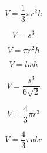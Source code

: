 






\[\begin{equation} V = \frac{1}{3} \pi r^2 h \end{equation}\]

\[\begin{equation} V = s^3 \end{equation}\]

\[\begin{equation} V = \pi r^2 h \end{equation}\]

\[\begin{equation} V = l w h \end{equation}\]

\[\begin{equation} V = \frac{s^3}{6 \sqrt{2}} \end{equation}\]

\[\begin{equation} \!V = \frac{4}{3}\pi r^3 \end{equation}\]

\[\begin{equation} V = \frac{4}{3} \pi a b c \end{equation}\]
